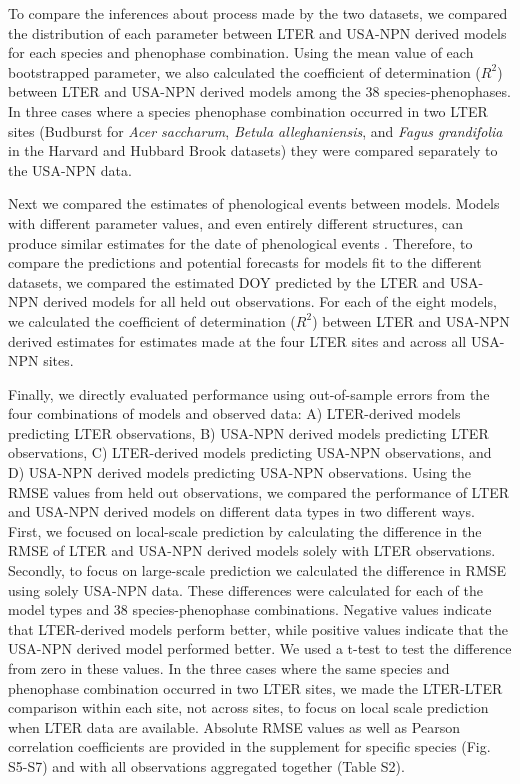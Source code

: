 \documentclass[fleqn,12pt,lineno]{article}
\begin{document}
To compare the inferences about process made by the two datasets, we compared the distribution of each parameter between LTER and USA-NPN derived models for each species and phenophase combination. Using the mean value of each bootstrapped parameter, we also calculated the coefficient of determination ($R^2$) between LTER and USA-NPN derived models among the 38 species-phenophases. In three cases where a species phenophase combination occurred in two LTER sites (Budburst for \textit{Acer saccharum}, \textit{Betula alleghaniensis}, and \textit{Fagus grandifolia} in the Harvard and Hubbard Brook datasets) they were compared separately to the USA-NPN data.

Next we compared the estimates of phenological events between models. Models with different parameter values, and even entirely different structures, can produce similar estimates for the date of phenological events \citep{basler2016}. Therefore, to compare the predictions and potential forecasts for models fit to the different datasets, we compared the estimated DOY predicted by the LTER and USA-NPN derived models for all held out observations. For each of the eight models, we calculated the coefficient of determination ($R^2$) between LTER and USA-NPN derived estimates for estimates made at the four LTER sites and across all USA-NPN sites.  

Finally, we directly evaluated performance using out-of-sample errors from the four combinations of models and observed data: A) LTER-derived models predicting LTER observations, B) USA-NPN derived models predicting LTER observations, C) LTER-derived models predicting USA-NPN observations, and D) USA-NPN derived models predicting USA-NPN observations. Using the RMSE values from held out observations, we compared the performance of LTER and USA-NPN derived models on different data types in two different ways. First, we focused on local-scale prediction by calculating the difference in the RMSE of LTER and USA-NPN derived models solely with LTER observations. Secondly, to focus on large-scale prediction we calculated the difference in RMSE using solely USA-NPN data. These differences were calculated for each of the model types and 38 species-phenophase combinations. Negative values indicate that LTER-derived models perform better, while positive values indicate that the USA-NPN derived model performed better. We used a t-test to test the difference from zero in these values. In the three cases where the same species and phenophase combination occurred in two LTER sites, we made the LTER-LTER comparison within each site, not across sites, to focus on local scale prediction when LTER data are available. Absolute RMSE values as well as Pearson correlation coefficients are provided in the supplement for specific species (Fig. S5-S7) and with all observations aggregated together (Table S2).
\end{document}

